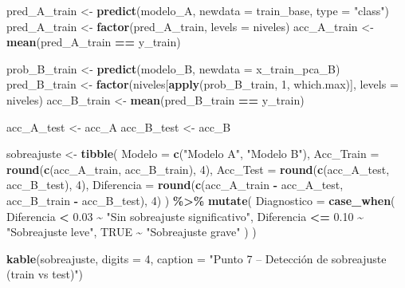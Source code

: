 \documentclass[
]{article}
\newenvironment{Shaded}{\begin{snugshade}}{\end{snugshade}}
\newcommand{\AttributeTok}[1]{\textcolor[rgb]{0.13,0.29,0.53}{#1}}
\newcommand{\ConstantTok}[1]{\textcolor[rgb]{0.56,0.35,0.01}{#1}}
\newcommand{\DecValTok}[1]{\textcolor[rgb]{0.00,0.00,0.81}{#1}}
\newcommand{\FloatTok}[1]{\textcolor[rgb]{0.00,0.00,0.81}{#1}}
\newcommand{\FunctionTok}[1]{\textcolor[rgb]{0.13,0.29,0.53}{\textbf{#1}}}
\newcommand{\NormalTok}[1]{#1}
\newcommand{\OtherTok}[1]{\textcolor[rgb]{0.56,0.35,0.01}{#1}}
\newcommand{\SpecialCharTok}[1]{\textcolor[rgb]{0.81,0.36,0.00}{\textbf{#1}}}
\newcommand{\StringTok}[1]{\textcolor[rgb]{0.31,0.60,0.02}{#1}}
\begin{document}
\begin{Shaded}
\begin{Highlighting}[]
\NormalTok{pred\_A\_train }\OtherTok{\textless{}{-}} \FunctionTok{predict}\NormalTok{(modelo\_A, }\AttributeTok{newdata =}\NormalTok{ train\_base, }\AttributeTok{type =} \StringTok{"class"}\NormalTok{)}
\NormalTok{pred\_A\_train }\OtherTok{\textless{}{-}} \FunctionTok{factor}\NormalTok{(pred\_A\_train, }\AttributeTok{levels =}\NormalTok{ niveles)}
\NormalTok{acc\_A\_train  }\OtherTok{\textless{}{-}} \FunctionTok{mean}\NormalTok{(pred\_A\_train }\SpecialCharTok{==}\NormalTok{ y\_train)}

\NormalTok{prob\_B\_train }\OtherTok{\textless{}{-}} \FunctionTok{predict}\NormalTok{(modelo\_B, }\AttributeTok{newdata =}\NormalTok{ x\_train\_pca\_B)}
\NormalTok{pred\_B\_train }\OtherTok{\textless{}{-}} \FunctionTok{factor}\NormalTok{(niveles[}\FunctionTok{apply}\NormalTok{(prob\_B\_train, }\DecValTok{1}\NormalTok{, which.max)], }\AttributeTok{levels =}\NormalTok{ niveles)}
\NormalTok{acc\_B\_train  }\OtherTok{\textless{}{-}} \FunctionTok{mean}\NormalTok{(pred\_B\_train }\SpecialCharTok{==}\NormalTok{ y\_train)}

\NormalTok{acc\_A\_test }\OtherTok{\textless{}{-}}\NormalTok{ acc\_A}
\NormalTok{acc\_B\_test }\OtherTok{\textless{}{-}}\NormalTok{ acc\_B}

\NormalTok{sobreajuste }\OtherTok{\textless{}{-}} \FunctionTok{tibble}\NormalTok{(}
  \AttributeTok{Modelo     =} \FunctionTok{c}\NormalTok{(}\StringTok{"Modelo A"}\NormalTok{, }\StringTok{"Modelo B"}\NormalTok{),}
  \AttributeTok{Acc\_Train  =} \FunctionTok{round}\NormalTok{(}\FunctionTok{c}\NormalTok{(acc\_A\_train, acc\_B\_train), }\DecValTok{4}\NormalTok{),}
  \AttributeTok{Acc\_Test   =} \FunctionTok{round}\NormalTok{(}\FunctionTok{c}\NormalTok{(acc\_A\_test, acc\_B\_test), }\DecValTok{4}\NormalTok{),}
  \AttributeTok{Diferencia =} \FunctionTok{round}\NormalTok{(}\FunctionTok{c}\NormalTok{(acc\_A\_train }\SpecialCharTok{{-}}\NormalTok{ acc\_A\_test, acc\_B\_train }\SpecialCharTok{{-}}\NormalTok{ acc\_B\_test), }\DecValTok{4}\NormalTok{)}
\NormalTok{) }\SpecialCharTok{\%\textgreater{}\%}
  \FunctionTok{mutate}\NormalTok{(}
    \AttributeTok{Diagnostico =} \FunctionTok{case\_when}\NormalTok{(}
\NormalTok{      Diferencia }\SpecialCharTok{\textless{}} \FloatTok{0.03} \SpecialCharTok{\textasciitilde{}} \StringTok{"Sin sobreajuste significativo"}\NormalTok{,}
\NormalTok{      Diferencia }\SpecialCharTok{\textless{}=} \FloatTok{0.10} \SpecialCharTok{\textasciitilde{}} \StringTok{"Sobreajuste leve"}\NormalTok{,}
      \ConstantTok{TRUE} \SpecialCharTok{\textasciitilde{}} \StringTok{"Sobreajuste grave"}
\NormalTok{    )}
\NormalTok{  )}

\FunctionTok{kable}\NormalTok{(sobreajuste, }\AttributeTok{digits =} \DecValTok{4}\NormalTok{,}
      \AttributeTok{caption =} \StringTok{"Punto 7 – Detección de sobreajuste (train vs test)"}\NormalTok{)}
\end{Highlighting}
\end{Shaded}
\end{document}

